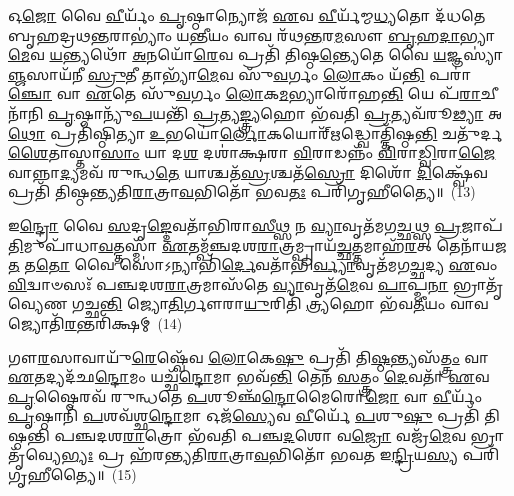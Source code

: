 𑌓\-\ul{𑌜𑍋} 𑌵𑍈 \ul{𑌵𑍀}\-𑌰𑍍𑌯𑌂᳴ \ul{𑌪𑍃}\-𑌷𑍍𑌠𑌾𑌨𑍍𑌯𑍋𑌜᳴ \ul{𑌏}\-𑌵 \ul{𑌵𑍀}\-𑌰𑍍𑌯᳴𑌮𑍍𑌮\-\ul{𑌧𑍍𑌯}\-𑌤𑍋 𑌦᳴𑌧𑌤𑍇 𑌬𑍃𑌹𑌦𑍍𑌰𑌥\-\ul{𑌨𑍍𑌤}\-𑌰𑌾\-𑌭𑍍𑌯𑌾𑌂॑ 𑌯\-\ul{𑌨𑍍𑌤𑍀}\-𑌯𑌂 𑌵𑌾𑌵 𑌰᳴𑌥\-\ul{𑌨𑍍𑌤}\-𑌰\-\ul{𑌮}\-𑌸𑍗 \ul{𑌬𑍃}\-𑌹\-\ul{𑌦𑌾}\-𑌭𑍍𑌯𑌾\-\ul{𑌮𑍇}\-𑌵 \ul{𑌯}\-𑌨𑍍𑌤𑍍𑌯𑌥𑍋᳴ \ul{𑌅}\-𑌨𑌯𑍋᳴\-\ul{𑌰𑍇}\-𑌵 𑌪𑍍𑌰𑌤𑌿᳴ 𑌤𑌿𑌷𑍍𑌠\-\ul{𑌨𑍍𑌤𑍍𑌯𑍇}\-𑌤𑍇 𑌵𑍈 \ul{𑌯}\-𑌜𑍍𑌞𑌸𑍍𑌯𑌾॑\-\ul{𑌞𑍍𑌜}\-𑌸𑌾𑌯᳴𑌨𑍀 \ul{𑌸𑍍𑌰𑍁}\-𑌤𑍀 𑌤𑌾𑌭𑍍𑌯𑌾᳴\-\ul{𑌮𑍇}\-𑌵 𑌸𑍁᳴\-\ul{𑌵}\-𑌰𑍍𑌗𑌂 \ul{𑌲𑍋}\-𑌕𑌂 𑌯᳴\-\ul{𑌨𑍍𑌤𑌿} 𑌪𑌰𑌾॑\-\ul{𑌞𑍍𑌚𑍋} 𑌵𑌾 \ul{𑌏}\-𑌤𑍇 𑌸𑍁᳴\-\ul{𑌵}\-𑌰𑍍𑌗𑌂 \ul{𑌲𑍋}\-𑌕\-\ul{𑌮}\-𑌭𑍍𑌯𑌾𑌰𑍋᳴𑌹\-\ul{𑌨𑍍𑌤𑌿} 𑌯𑍇 𑌪᳴\-\ul{𑌰𑌾}\-𑌚𑍀𑌨𑌾᳴𑌨𑌿 \ul{𑌪𑍃}\-𑌷𑍍𑌠𑌾𑌨𑍍𑌯𑍁᳴\-\ul{𑌪}\-𑌯𑌨𑍍𑌤𑌿᳴ \ul{𑌪𑍍𑌰}\-𑌤𑍍𑌯\-\ul{𑌙𑍍𑌤𑍍𑌰𑍍𑌯}\-𑌹𑍋 𑌭᳴𑌵𑌤𑌿 \ul{𑌪𑍍𑌰}\-𑌤𑍍𑌯𑌵᳴𑌰𑍂\-\ul{𑌢𑍍𑌯𑌾} 𑌅\-\ul{𑌥𑍋} 𑌪𑍍𑌰𑌤𑌿᳴𑌷𑍍𑌠𑌿𑌤𑍍𑌯𑌾 \ul{𑌉}\-𑌭𑌯𑍋॑\-\ul{𑌰𑍍𑌲𑍋}\-𑌕𑌯𑍋𑌰𑍍\mbox{}᳴\-\ul{𑌋}\-𑌦𑍍𑌧𑍍𑌵𑍋𑌤𑍍𑌤𑌿᳴𑌷𑍍𑌠\-\ul{𑌨𑍍𑌤𑌿} 𑌚𑌤𑍁᳴𑌰𑍍𑌦\-\ul{𑌶𑍈}\-𑌤𑌾𑌸𑍍𑌤𑌾\-\ul{𑌸𑌾𑌂} 𑌯𑌾 𑌦\-\ul{𑌶} 𑌦𑌶𑌾॑𑌕𑍍𑌷𑌰𑌾 \ul{𑌵𑌿}\-𑌰𑌾𑌡𑌨𑍍𑌨𑌂᳴ \ul{𑌵𑌿}\-𑌰𑌾\-\ul{𑌡𑍍𑌵𑌿}\-𑌰𑌾\-\ul{𑌜𑍈}\-𑌵𑌾𑌨𑍍𑌨𑌾\-\ul{𑌦𑍍𑌯}\-𑌮𑌵᳴ 𑌰𑍁𑌨𑍍𑌧\-\ul{𑌤𑍇} 𑌯𑌾𑌶𑍍𑌚𑌤᳴\-\ul{𑌸𑍍𑌰}\-𑌶𑍍𑌚𑌤᳴\-\ul{𑌸𑍍𑌰𑍋} 𑌦𑌿𑌶𑍋᳴ \ul{𑌦𑌿}\-𑌕𑍍𑌷𑍍𑌵𑍇᳴𑌵 𑌪𑍍𑌰𑌤𑌿᳴ 𑌤𑌿𑌷𑍍𑌠𑌨𑍍𑌤𑍍𑌯𑌤𑌿\-\ul{𑌰𑌾}\-𑌤𑍍𑌰𑌾\-\ul{𑌵}\-𑌭𑌿𑌤𑍋᳴ 𑌭𑌵\-\ul{𑌤𑌃} 𑌪𑌰𑌿᳴𑌗𑍃𑌹𑍀𑌤𑍍𑌯𑍈॥~(13)

{\anuvakamend[{𑌆𑌰𑍍𑌧𑍍𑌨𑍁᳴𑌵\-\ul{𑌨𑍍𑌤𑍍𑌰𑍍𑌯}\-𑌹𑌾𑌭𑍍𑌯𑌾᳴\-\ul{𑌮}\-𑌸𑍍𑌮𑌿𑌨𑍍𑌥𑍍𑌸᳴𑌵𑌿𑌵\-\ul{𑌧}\-𑌤𑍍𑌵𑌾\-\ul{𑌯} 𑌪𑍍𑌰𑌤𑌿᳴𑌷𑍍𑌠𑌿\-\ul{𑌤𑍍𑌯𑌾} 𑌏𑌕᳴𑌤𑍍𑌰𑌿𑍞𑌶𑌚𑍍𑌚}]}%

𑌇\-\ul{𑌨𑍍𑌦𑍍𑌰𑍋} 𑌵𑍈 \ul{𑌸}\-𑌦𑍃\-\ul{𑌙𑍍𑌦𑍇}\-𑌵𑌤𑌾᳴𑌭𑌿𑌰𑌾\-\ul{𑌸𑍀}\-𑌥𑍍𑌸 𑌨 \ul{𑌵𑍍𑌯𑌾}\-𑌵𑍃𑌤᳴𑌮𑌗\-\ul{𑌚𑍍𑌛}\-𑌥𑍍𑌸 \ul{𑌪𑍍𑌰}\-𑌜𑌾𑌪᳴\-\ul{𑌤𑌿}\-𑌮𑍁𑌪𑌾᳴𑌧𑌾\-\ul{𑌵}\-𑌤𑍍𑌤𑌸𑍍𑌮𑌾᳴ \ul{𑌏}\-𑌤𑌮𑍍𑌪᳴𑌞𑍍𑌚𑌦𑌶\-\ul{𑌰𑌾}\-𑌤𑍍𑌰𑌮𑍍𑌪𑍍𑌰𑌾𑌯᳴\-\ul{𑌚𑍍𑌛}\-𑌤𑍍𑌤𑌮𑌾𑌹᳴\-\ul{𑌰}\-𑌤𑍍 𑌤𑍇𑌨𑌾᳴𑌯𑌜\-\ul{𑌤} 𑌤\-\ul{𑌤𑍋} 𑌵𑍈 𑌸𑍋॑\-𑌽𑌨𑍍𑌯𑌾𑌭𑌿᳴\-\ul{𑌰𑍍𑌦𑍇}\-𑌵𑌤𑌾᳴𑌭𑌿\-\ul{𑌰𑍍𑌵𑍍𑌯𑌾}\-𑌵𑍃𑌤᳴𑌮𑌗\-\ul{𑌚𑍍𑌛}\-𑌦𑍍𑌯 \ul{𑌏}\-𑌵𑌂 \ul{𑌵𑌿}\-𑌦𑍍𑌵𑌾𑍞𑌸𑌃᳴ 𑌪𑌞𑍍𑌚𑌦𑌶\-\ul{𑌰𑌾}\-𑌤𑍍𑌰𑌮𑌾𑌸᳴𑌤𑍇 \ul{𑌵𑍍𑌯𑌾}\-𑌵𑍃𑌤᳴\-\ul{𑌮𑍇}\-𑌵 \ul{𑌪𑌾}\-𑌪𑍍𑌮\-\ul{𑌨𑌾} 𑌭𑍍𑌰𑌾𑌤𑍃᳴𑌵𑍍𑌯𑍇𑌣 𑌗𑌚𑍍𑌛\-\ul{𑌨𑍍𑌤𑌿} 𑌜𑍍𑌯𑍋\-\ul{𑌤𑌿}\-𑌰𑍍𑌗𑍗𑌰𑌾\-\ul{𑌯𑍁}\-𑌰𑌿𑌤𑌿᳴ \ul{𑌤𑍍𑌰𑍍𑌯}\-𑌹𑍋 𑌭᳴𑌵\-\ul{𑌤𑍀}\-𑌯𑌂 𑌵𑌾𑌵 𑌜𑍍𑌯𑍋𑌤𑌿᳴\-\ul{𑌰}\-𑌨𑍍𑌤𑌰𑌿᳴𑌕𑍍𑌷𑌮𑍍~(14)

𑌗𑍗\-\ul{𑌰}\-𑌸𑌾𑌵𑌾𑌯𑍁᳴\-\ul{𑌰𑍇}\-𑌷𑍍𑌵𑍇᳴𑌵 \ul{𑌲𑍋}\-𑌕𑍇\-\ul{𑌷𑍁} 𑌪𑍍𑌰𑌤𑌿᳴ 𑌤𑌿\-\ul{𑌷𑍍𑌠}\-𑌨𑍍𑌤𑍍𑌯𑌸᳴\-\ul{𑌤𑍍𑌤𑍍𑌰𑌂} 𑌵𑌾 \ul{𑌏}\-𑌤𑌦𑍍𑌯𑌦᳴𑌛\-\ul{𑌨𑍍𑌦𑍋}\-𑌮𑌂 𑌯𑌚𑍍𑌛᳴\-\ul{𑌨𑍍𑌦𑍋}\-𑌮𑌾 𑌭𑌵᳴\-\ul{𑌨𑍍𑌤𑌿} 𑌤𑍇𑌨᳴ \ul{𑌸}\-𑌤𑍍𑌤𑍍𑌰𑌂 \ul{𑌦𑍇}\-𑌵𑌤𑌾᳴ \ul{𑌏}\-𑌵 \ul{𑌪𑍃}\-𑌷𑍍𑌠𑍈𑌰𑌵᳴ 𑌰𑍁𑌨𑍍𑌧𑌤𑍇 \ul{𑌪}\-𑌶𑍂𑌞𑍍𑌛᳴\-\ul{𑌨𑍍𑌦𑍋}\-𑌮𑍈𑌰𑍋\-\ul{𑌜𑍋} 𑌵𑌾 \ul{𑌵𑍀}\-𑌰𑍍𑌯𑌂᳴ \ul{𑌪𑍃}\-𑌷𑍍𑌠𑌾𑌨𑌿᳴ \ul{𑌪}\-𑌶𑌵᳴𑌶𑍍𑌛\-\ul{𑌨𑍍𑌦𑍋}\-𑌮𑌾 𑌓𑌜᳴\-\ul{𑌸𑍍𑌯𑍇}\-𑌵 \ul{𑌵𑍀}\-𑌰𑍍𑌯𑍇᳴ \ul{𑌪}\-𑌶𑍁\-\ul{𑌷𑍁} 𑌪𑍍𑌰𑌤𑌿᳴ 𑌤𑌿𑌷𑍍𑌠𑌨𑍍𑌤𑌿 𑌪𑌞𑍍𑌚𑌦𑌶\-\ul{𑌰𑌾}\-𑌤𑍍𑌰𑍋 𑌭᳴𑌵𑌤𑌿 𑌪𑌞𑍍𑌚\-\ul{𑌦}\-𑌶𑍋 𑌵\-\ul{𑌜𑍍𑌰𑍋} 𑌵𑌜𑍍𑌰᳴\-\ul{𑌮𑍇}\-𑌵 𑌭𑍍𑌰𑌾𑌤𑍃᳴𑌵𑍍𑌯𑍇\-\ul{𑌭𑍍𑌯𑌃} 𑌪𑍍𑌰 𑌹᳴𑌰𑌨𑍍𑌤𑍍𑌯𑌤𑌿\-\ul{𑌰𑌾}\-𑌤𑍍𑌰𑌾\-\ul{𑌵}\-𑌭𑌿𑌤𑍋᳴ 𑌭𑌵𑌤 𑌇\-\ul{𑌨𑍍𑌦𑍍𑌰𑌿}\-𑌯\-\ul{𑌸𑍍𑌯} 𑌪𑌰𑌿᳴𑌗𑍃𑌹𑍀𑌤𑍍𑌯𑍈॥~(15)

{\anuvakamend[{\-\ul{𑌅}\-𑌨𑍍𑌤𑌰𑌿᳴𑌕𑍍𑌷𑌮𑌿\-\ul{𑌨𑍍𑌦𑍍𑌰𑌿}\-𑌯𑌸𑍍𑌯𑍈𑌕᳴𑌞𑍍𑌚}]}%

